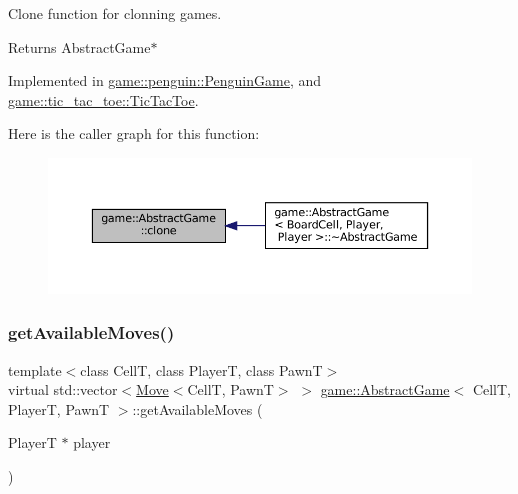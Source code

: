 Clone function for clonning games. 

\begin{DoxyReturn}{Returns}
Abstract\+Game$\ast$ 
\end{DoxyReturn}


Implemented in \hyperlink{classgame_1_1penguin_1_1_penguin_game_af4277cfe44814a9b99051348f25ce264}{game\+::penguin\+::\+Penguin\+Game}, and \hyperlink{classgame_1_1tic__tac__toe_1_1_tic_tac_toe_a11f31f44ee9ebe8c394bcc9f2a74fab4}{game\+::tic\+\_\+tac\+\_\+toe\+::\+Tic\+Tac\+Toe}.

Here is the caller graph for this function\+:
\nopagebreak
\begin{figure}[H]
\begin{center}
\leavevmode
\includegraphics[width=350pt]{classgame_1_1_abstract_game_a226baac1f32a8f6672d922675ffddbf6_icgraph}
\end{center}
\end{figure}
\mbox{\label{classgame_1_1_abstract_game_a01bbff0af90cc978203726bc7f914a7b}} 
\subsubsection{\texorpdfstring{get\+Available\+Moves()}{getAvailableMoves()}}
{\footnotesize\ttfamily template$<$class CellT, class PlayerT, class PawnT$>$ \\
virtual std\+::vector$<$\hyperlink{structgame_1_1_move}{Move}$<$CellT, PawnT$>$ $>$ \hyperlink{classgame_1_1_abstract_game}{game\+::\+Abstract\+Game}$<$ CellT, PlayerT, PawnT $>$\+::get\+Available\+Moves (\begin{DoxyParamCaption}\item[{PlayerT $\ast$}]{player }\end{DoxyParamCaption})\hspace{0.3cm}{\ttfamily [pure virtual]}}



